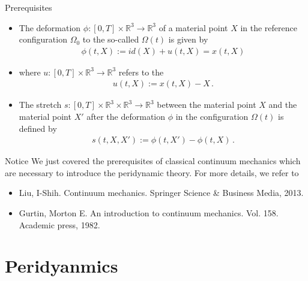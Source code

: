\documentclass[\classoption]{beamer}
\newcommand{\R}{\mathbb{R}}
\begin{document}
\begin{frame}{}
\begin{block}{Prerequisites}
\begin{itemize}
\item  The deformation $\phi:[0,T]\times\R^3\rightarrow\R^3$ of a material point $X$ in the reference configuration $\Omega_0$ to the so-called  $\Omega(t)$ is given by
\begin{align*}
\phi(t,X) := id(X) + u(t,X) = x(t,X)
\end{align*}
\item where $u:[0,T]\times\R^3\rightarrow\R^3$ refers to the 
\begin{align*}
u(t,X):= x(t,X) - X\,\text{.}
\end{align*}
\item The stretch $s:[0,T]\times\R^3\times\R^3\rightarrow\R^3$ between the material point $X$ and the material point $X'$ after the deformation $\phi$ in the configuration $\Omega(t)$ is defined by
\begin{align*}
s(t,X,X') := \phi(t,X') - \phi(t,X) \,\text{.}
\end{align*}
\end{itemize}

\end{block}

\end{frame}

\begin{frame}{Notice}
We just covered the prerequisites of classical continuum mechanics which are necessary to introduce the peridynamic theory. For more details, we refer to \\
\begin{itemize}
\item Liu, I-Shih. Continuum mechanics. Springer Science \& Business Media, 2013. 
\item Gurtin, Morton E. An introduction to continuum mechanics. Vol. 158. Academic press, 1982.
\end{itemize}
\end{frame}

\section{Peridyanmics}
\end{document}
